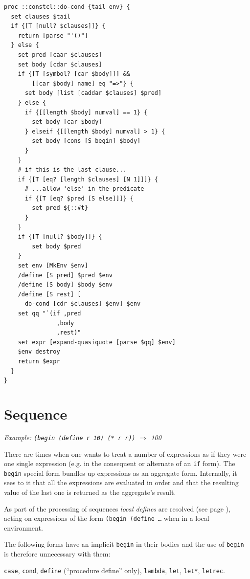 \documentclass[twoside]{report}
\begin{document}
\begin{lstlisting}
proc ::constcl::do-cond {tail env} {
  set clauses $tail
  if {[T [null? $clauses]]} {
    return [parse "'()"]
  } else {
    set pred [caar $clauses]
    set body [cdar $clauses]
    if {[T [symbol? [car $body]]] &&
        [[car $body] name] eq "=>"} {
      set body [list [caddar $clauses] $pred]
    } else {
      if {[[length $body] numval] == 1} {
        set body [car $body]
      } elseif {[[length $body] numval] > 1} {
        set body [cons [S begin] $body]
      }
    }
    # if this is the last clause...
    if {[T [eq? [length $clauses] [N 1]]]} {
      # ...allow 'else' in the predicate
      if {[T [eq? $pred [S else]]]} {
        set pred ${::#t}
      }
    }
    if {[T [null? $body]]} {
        set body $pred
    }
    set env [MkEnv $env]
    /define [S pred] $pred $env
    /define [S body] $body $env
    /define [S rest] [
      do-cond [cdr $clauses] $env] $env
    set qq "`(if ,pred
               ,body
               ,rest)"
    set expr [expand-quasiquote [parse $qq] $env]
    $env destroy
    return $expr
  }
}
\end{lstlisting}

\section{Sequence}
\label{sequence}

\emph{Example: \texttt{(begin (define r 10) (* r r))} $\Rightarrow$ 100}

There are times when one wants to treat a number of expressions as if they were one single expression (e.g. in the consequent or alternate of an \texttt{if} form). The \texttt{begin} special form bundles up expressions as an aggregate form. Internally, it sees to it that all the expressions are evaluated in order and that the resulting value of the last one is returned as the aggregate's result.

As part of the processing of sequences \emph{local defines} are resolved (see page \pageref{resolving-local-defines}), acting on expressions of the form \texttt{(begin (define \ldots } when in a local environment.

The following forms have an implicit \texttt{begin} in their bodies and the use of \texttt{begin} is therefore unnecessary with them:

\texttt{case}, \texttt{cond}, \texttt{define} (“procedure define” only), \texttt{lambda}, \texttt{let}, \texttt{let*}, \texttt{letrec}.
\end{document}
